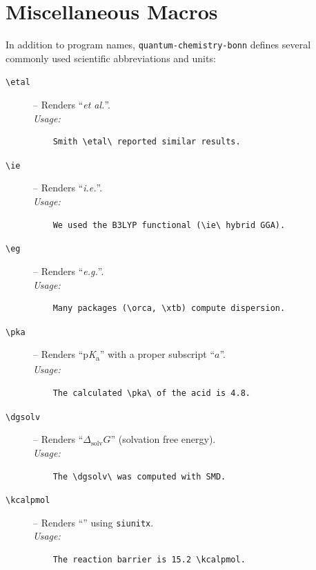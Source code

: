 \documentclass[a4paper,12pt]{article}
\begin{document}
\section{Miscellaneous Macros}
\label{sec:misc}
In addition to program names, \texttt{quantum-chemistry-bonn} defines several commonly used scientific abbreviations and units:

\begin{description}
    \item[\texttt{\textbackslash etal}]  – Renders “\textit{et al.}”. \\
    \textit{Usage:} 
    \begin{verbatim}
    Smith \etal\ reported similar results.
    \end{verbatim}

    \item[\texttt{\textbackslash ie}]    – Renders “\textit{i.e.}”. \\
    \textit{Usage:} 
    \begin{verbatim}
    We used the B3LYP functional (\ie\ hybrid GGA).
    \end{verbatim}

    \item[\texttt{\textbackslash eg}]   – Renders “\textit{e.g.}”. \\
    \textit{Usage:} 
    \begin{verbatim}
    Many packages (\orca, \xtb) compute dispersion.
    \end{verbatim}

    \item[\texttt{\textbackslash pka}]   – Renders “p\textit{K}\textsubscript{a}” with a proper subscript “$a$”. \\
    \textit{Usage:} 
    \begin{verbatim}
    The calculated \pka\ of the acid is 4.8.
    \end{verbatim}

    \item[\texttt{\textbackslash dgsolv}] – Renders ``$\Delta_\mathrm{solv}G$'' (solvation free energy). \\
    \textit{Usage:} 
    \begin{verbatim}
    The \dgsolv\ was computed with SMD.
    \end{verbatim}

    \item[\texttt{\textbackslash kcalpmol}] – Renders ``\kcalpmol'' using \texttt{siunitx}. \\
    \textit{Usage:} 
    \begin{verbatim}
    The reaction barrier is 15.2 \kcalpmol.
    \end{verbatim}


\end{description}
\end{document}
